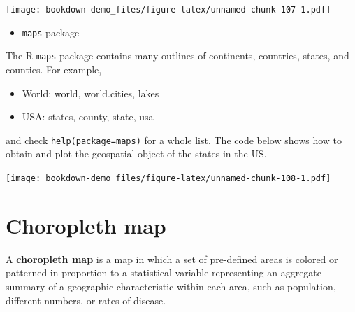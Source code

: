 \documentclass[]{book}
\newenvironment{Shaded}{\begin{snugshade}}{\end{snugshade}}
\newcommand{\KeywordTok}[1]{\textcolor[rgb]{0.13,0.29,0.53}{\textbf{#1}}}
\newcommand{\DataTypeTok}[1]{\textcolor[rgb]{0.13,0.29,0.53}{#1}}
\newcommand{\DecValTok}[1]{\textcolor[rgb]{0.00,0.00,0.81}{#1}}
\newcommand{\StringTok}[1]{\textcolor[rgb]{0.31,0.60,0.02}{#1}}
\newcommand{\OtherTok}[1]{\textcolor[rgb]{0.56,0.35,0.01}{#1}}
\newcommand{\OperatorTok}[1]{\textcolor[rgb]{0.81,0.36,0.00}{\textbf{#1}}}
\newcommand{\NormalTok}[1]{#1}
\providecommand{\tightlist}{%
  \setlength{\itemsep}{0pt}\setlength{\parskip}{0pt}}
\begin{document}
\texttt{[image: bookdown-demo\_files/figure-latex/unnamed-chunk-107-1.pdf]}

\begin{itemize}
\tightlist
\item
  \texttt{maps} package
\end{itemize}

The R \texttt{maps} package contains many outlines of continents,
countries, states, and counties. For example,

\begin{itemize}
\tightlist
\item
  World: world, world.cities, lakes
\item
  USA: states, county, state, usa
\end{itemize}

and check
\texttt{help(package=\textquotesingle{}maps\textquotesingle{})} for a
whole list. The code below shows how to obtain and plot the geospatial
object of the states in the US.

\begin{Shaded}
\end{Shaded}

\texttt{[image: bookdown-demo\_files/figure-latex/unnamed-chunk-108-1.pdf]}

\section{Choropleth map}\label{choropleth-map}

A \textbf{choropleth map} is a map in which a set of pre-defined areas
is colored or patterned in proportion to a statistical variable
representing an aggregate summary of a geographic characteristic within
each area, such as population, different numbers, or rates of disease.
\end{document}
